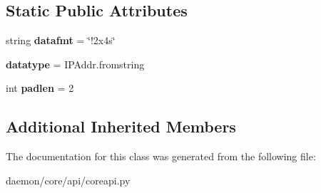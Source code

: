 \subsection*{Static Public Attributes}
\begin{DoxyCompactItemize}
\item 
\hypertarget{classcore_1_1api_1_1coreapi_1_1_core_tlv_data_i_pv4_addr_aa1ce2ddef2b89c59d584e787339a8bf0}{string {\bfseries datafmt} = \char`\"{}!2x4s\char`\"{}}\label{classcore_1_1api_1_1coreapi_1_1_core_tlv_data_i_pv4_addr_aa1ce2ddef2b89c59d584e787339a8bf0}

\item 
\hypertarget{classcore_1_1api_1_1coreapi_1_1_core_tlv_data_i_pv4_addr_a67c4bd2d71ca9a863c2904f9239ad29f}{{\bfseries datatype} = I\+P\+Addr.\+fromstring}\label{classcore_1_1api_1_1coreapi_1_1_core_tlv_data_i_pv4_addr_a67c4bd2d71ca9a863c2904f9239ad29f}

\item 
\hypertarget{classcore_1_1api_1_1coreapi_1_1_core_tlv_data_i_pv4_addr_a69172f5dc0ff1bba345f6a891414c7fd}{int {\bfseries padlen} = 2}\label{classcore_1_1api_1_1coreapi_1_1_core_tlv_data_i_pv4_addr_a69172f5dc0ff1bba345f6a891414c7fd}

\end{DoxyCompactItemize}
\subsection*{Additional Inherited Members}


The documentation for this class was generated from the following file\+:\begin{DoxyCompactItemize}
\item 
daemon/core/api/coreapi.\+py\end{DoxyCompactItemize}
